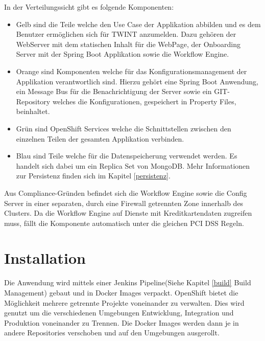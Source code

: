 In der Verteilungssicht gibt es folgende Komponenten:\newline
\begin{itemize}
	\item Gelb sind die Teile welche den Use Case der Applikation abbilden und es dem Benutzer ermöglichen sich für TWINT anzumelden. Dazu gehören der WebServer mit dem statischen Inhalt für die WebPage, der Onboarding Server mit der Spring Boot Applikation sowie die Workflow Engine.
	\item Orange sind Komponenten welche für das Konfigurationsmanagement der Applikation verantwortlich sind. Hierzu gehört eine Spring Boot Anwendung, ein Message Bus für die Benachrichtigung der Server sowie ein GIT-Repository welches die Konfigurationen, gespeichert in Property Files, beinhaltet.
	\item Grün sind OpenShift Services welche die Schnittstellen zwischen den einzelnen Teilen der gesamten Applikation verbinden.
	\item Blau sind Teile welche für die Datenspeicherung verwendet werden. Es handelt sich dabei um ein Replica Set von MongoDB. Mehr Informationen zur Persistenz finden sich im Kapitel \ref{persistenz}.
\end{itemize}

Aus Compliance-Gründen befindet sich die Workflow Engine sowie die Config Server in einer separaten, durch eine Firewall getrennten Zone innerhalb des Clusters. Da die Workflow Engine auf Dienste mit Kreditkartendaten zugreifen muss, fällt die Komponente automatisch unter die gleichen PCI DSS Regeln. 

\section{Installation}

Die Anwendung wird mittels einer Jenkins Pipeline(Siehe Kapitel \ref{build} Build Management) gebaut und in Docker Images verpackt. OpenShift bietet die Möglichkeit mehrere getrennte Projekte voneinander zu verwalten. Dies wird genutzt um die verschiedenen Umgebungen Entwicklung, Integration und Produktion voneinander zu Trennen. Die Docker Images werden dann je in andere Repositories verschoben und auf den Umgebungen ausgerollt.


